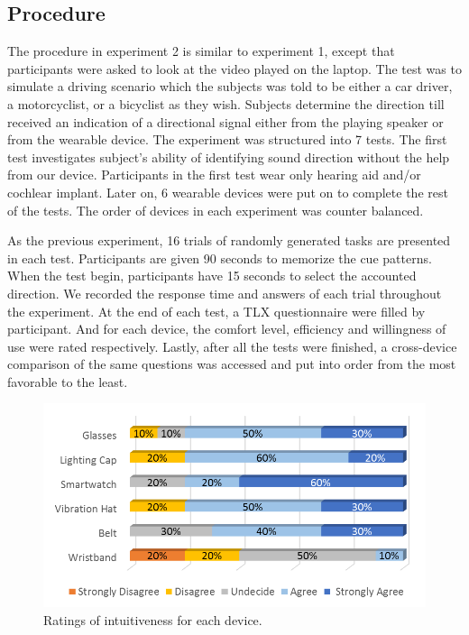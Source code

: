 \documentclass{sigchi}
\begin{document}
\subsection{Procedure}
The procedure in experiment 2 is similar to experiment 1, except that participants were asked to look at the video played on the laptop. The test was to simulate a driving scenario which the subjects was told to be either a car driver, a motorcyclist, or a bicyclist as they wish. Subjects determine the direction till received an indication of a directional signal either from the playing speaker or from the wearable device. The experiment was structured into 7 tests. The first test investigates subject's ability of identifying sound direction without the help from our device. Participants in the first test wear only hearing aid and/or cochlear implant. Later on, 6 wearable devices were put on to complete the rest of the tests. The order of devices in each experiment was counter balanced.

As the previous experiment, 16 trials of randomly generated tasks are presented in each test. Participants are given 90 seconds to memorize the cue patterns. When the test begin, participants have 15 seconds to select the accounted direction. We recorded the response time and answers of each trial throughout the experiment. At the end of each test, a TLX questionnaire were filled by participant. And for each device, the comfort level, efficiency and willingness of use were rated respectively. Lastly, after all the tests were finished, a cross-device comparison of the same questions was accessed and put into order from the most favorable to the least.

\begin{figure}[!t]
\centering
\includegraphics[width=\columnwidth]{Likert_Intuitive}
\caption{Ratings of intuitiveness for each device.}
\label{fig:Likert_Intuitive}
\end{figure}
\end{document}
